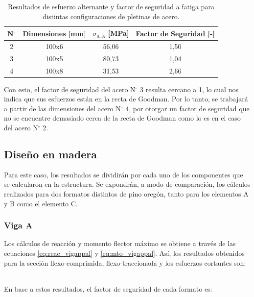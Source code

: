 \begin{table}[h]
\centering
\begin{tabular}{@{}cccc@{}}
\toprule
N$^{\circ}$ & Dimensiones [mm] & $\sigma_{a,A}$ [MPa] & Factor de Seguridad [-] \\ \midrule
2 & 100x6 & 56,06 & 1,50 \\
3 & 100x5 & 80,73 & 1,04 \\
4 & 100x8 & 31,53 & 2,66 \\ \bottomrule
\end{tabular}
\caption{Resultados de esfuerzo alternante y factor de seguridad a fatiga para distintas configuraciones de pletinas de acero.}
\label{tab:itfat_acero}
\end{table}

Con esto, el factor de seguridad del acero N$^{\circ}$ 3 resulta cercano a 1, lo cual nos indica que sus esfuerzos están en la recta de Goodman. Por lo tanto, se trabajará a partir de las dimensiones del acero N$^{\circ}$ 4, por otorgar un factor de seguridad que no se encuentre demasiado cerca de la recta de Goodman como lo es en el caso del acero N$^{\circ}$ 2. 

\subsection{Diseño en madera}
Para este caso, los resultados se dividirán por cada uno de los componentes que se calcularon en la estructura. Se expondrán, a modo de comparación, los cálculos realizados para dos formatos distintos de pino oregón, tanto para los elementos A y B como el elemento C.

\subsubsection{Viga A} Los cálculos de reacción y momento flector máximo se obtiene a través de las ecuaciones \ref{eq:reac_vigappal} y \ref{eq:mto_vigappal}. Así, los resultados obtenidos para la sección flexo-comprimida, flexo-traccionada y los esfuerzos cortantes son:
\begin{table}[h]
\centering
{}
\caption{Resultados obtenidos para la flexión y cizalle de la viga A.}
\label{tab:res_viga_a1}
\end{table}
\\
En base a estos resultados, el factor de seguridad de cada formato es:

